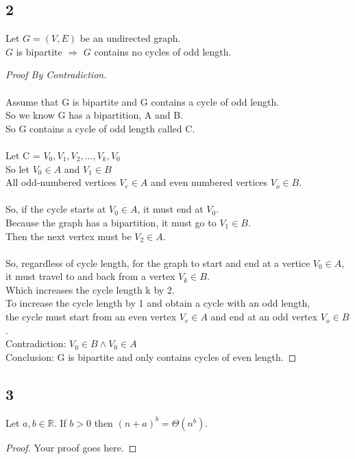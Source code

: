 \documentclass[14pt]{extarticle}
\begin{document}
\subsection*{2}
Let $G =(V, E)$ be an undirected graph.\\
$G$ is bipartite $\Rightarrow$ $G$ contains no cycles of odd length.
\begin{proof}[Proof By Contradiction]\hfill \\ \\
Assume that G is bipartite and G contains a cycle of odd length. \\
So we know G has a bipartition, A and B. \\
So G contains a cycle of odd length called C.\\ \\
Let C = $V_0, V_1, V_2, ..., V_k, V_0 $ \\
So let $V_0 \in A$ and $V_1 \in B$ \\
All odd-numbered vertices $V_e\in A$ and even numbered vertices $V_o \in B$. \\ \\
So, if the cycle starts at $V_0 \in A$, it must end at $V_0$.\\
Because the graph has a bipartition, it must go to $V_1 \in B$.\\
Then the next vertex must be $V_2 \in A$. \\ \\
So, regardless of cycle length, for the graph to start and end at a vertice $V_0 \in A$, it must travel to and back from a vertex $V_k \in B$. \\ 
Which increases the cycle length k by 2. \\

To increase the cycle length by 1 and obtain a cycle with an odd length, \\ the cycle must start from an even vertex $V_e \in A$ and end at an odd vertex $V_o \in B$.  \\

Contradiction:  $V_0 \in B \land V_0 \in A$ \\

Conclusion: G is bipartite and only contains cycles of even length.


\end{proof}

\subsection*{3}

Let $a, b \in \mathbb{R}$. If $b>0$ then $(n+a)^b = \Theta(n^b)$.
\begin{proof}
Your proof goes here.
\end{proof}
\end{document}

